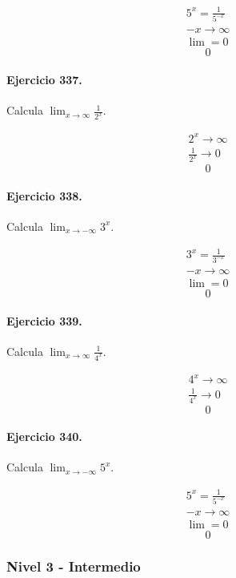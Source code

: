 \documentclass[11pt,a4paper]{article}
\begin{document}
\[
\begin{aligned}
5^x=\frac{1}{5^{-x}}\\
-x\to\infty\\
\lim=0
\end{aligned}
\]
\[\boxed{0}\]


\paragraph{Ejercicio 337.} Calcula $\displaystyle\lim_{x\to\infty}\frac{1}{2^x}$.

\[
\begin{aligned}
2^x\to\infty\\
\frac{1}{2^x}\to0
\end{aligned}
\]
\[\boxed{0}\]


\paragraph{Ejercicio 338.} Calcula $\displaystyle\lim_{x\to-\infty}3^x$.

\[
\begin{aligned}
3^x=\frac{1}{3^{-x}}\\
-x\to\infty\\
\lim=0
\end{aligned}
\]
\[\boxed{0}\]


\paragraph{Ejercicio 339.} Calcula $\displaystyle\lim_{x\to\infty}\frac{1}{4^x}$.

\[
\begin{aligned}
4^x\to\infty\\
\frac{1}{4^x}\to0
\end{aligned}
\]
\[\boxed{0}\]


\paragraph{Ejercicio 340.} Calcula $\displaystyle\lim_{x\to-\infty}5^x$.

\[
\begin{aligned}
5^x=\frac{1}{5^{-x}}\\
-x\to\infty\\
\lim=0
\end{aligned}
\]
\[\boxed{0}\]


\newpage

\subsubsection*{Nivel 3 - Intermedio}
\end{document}

